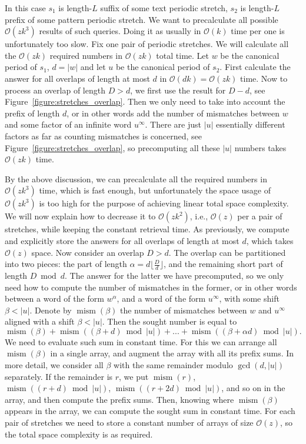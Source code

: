 \documentclass[runningheads]{llncs}
\DeclareMathOperator{\mism}{mism}
\begin{document}
\begin{mycases}[listparindent=15pt]
\item In this case $s_1$ is length-$L$ suffix of some text periodic stretch, $s_2$ is length-$L$ prefix of some pattern periodic stretch. We want to precalculate all possible $\mathcal{O}(zk^3)$ results of such queries. Doing it as usually in $\mathcal{O}(k)$ time per one is unfortunately too slow. Fix one pair of periodic stretches. We will calculate all the $\mathcal{O}(zk)$ required numbers in $\mathcal{O}(zk)$ total time. Let $w$ be the canonical period of $s_1$, $d=|w|$ and let $u$ be the canonical period of $s_2$. First calculate the answer for all overlaps of length at most $d$ in $\mathcal{O}(dk)=\mathcal{O}(zk)$ time. Now to process an overlap of length $D>d$, we first use the result for $D-d$, see Figure~\ref{figure:stretches_overlap}. Then we only need to take into account the prefix of length $d$, or in other words add the number of mismatches between $w$ and some factor of an infinite word $u^{\infty}$. There are just $|u|$ essentially different factors as far as counting mismatches is concerned, see Figure~\ref{figure:stretches_overlap}, so precomputing all these $|u|$ numbers takes $\mathcal{O}(zk)$ time.

By the above discussion, we can precalculate all the required numbers in $\mathcal{O}(zk^3)$ time, which is fast enough, but unfortunately the space usage of $\mathcal{O}(zk^3)$ is 
too high for the purpose of achieving linear total space complexity. We will now explain how to decrease it to $\mathcal{O}(zk^2)$, i.e., $\mathcal{O}(z)$ per a pair of stretches,
while keeping the constant retrieval time. As previously, we compute and explicitly store the answers for all overlaps of length at most $d$, which takes $\mathcal{O}(z)$ space.
Now consider an overlap $D>d$. The overlap can be partitioned into two pieces: the part of length
$\alpha=d\lfloor\frac{D}{d}\rfloor$, and the remaining short part of length $D\bmod d$. The answer for the latter we have precomputed, so we only need how to compute the number of 
mismatches in the former, or in other words between a word of the form $w^\alpha$, and a word of the form $u^\infty$, with some shift $\beta < |u|$.
Denote by $\mism(\beta)$ the number of mismatches between $w$ and $u^\infty$ aligned with a shift $\beta <|u|$. Then the sought number
is equal to
$$\mism(\beta)+\mism((\beta + d)\bmod |u|)+... +\mism((\beta + \alpha d)\bmod |u|).$$
We need to evaluate such sum in constant time. For this we can arrange all $\mism(\beta)$ in a single array, and augment the array with all its prefix sums.
In more detail, we consider all $\beta$ with the same remainder modulo $\gcd(d,|u|)$ separately. If the remainder is $r$, we put $\mism(r)$, $\mism((r+d)\bmod |u|)$,
$\mism((r+2d)\bmod |u|)$, and so on in the array, and then compute the prefix sums. Then, knowing where $\mism(\beta)$ appears in the array, we can compute the
sought sum in constant time. For each pair of stretches we need to store a constant number of arrays of size $\mathcal{O}(z)$, so the total space complexity is as required.


\end{mycases}
\end{document}
